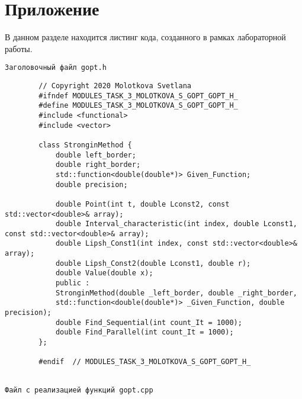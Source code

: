 \documentclass{report}
\begin{document}
	\section*{Приложение}
	В данном разделе находится листинг кода, созданного в рамках лабораторной работы. \par
	\texttt{Заголовочный файл gopt.h}
	\begin{lstlisting}
		// Copyright 2020 Molotkova Svetlana
		#ifndef MODULES_TASK_3_MOLOTKOVA_S_GOPT_GOPT_H_
		#define MODULES_TASK_3_MOLOTKOVA_S_GOPT_GOPT_H_
		#include <functional>
		#include <vector>
		
		class StronginMethod {
			double left_border;
			double right_border;
			std::function<double(double*)> Given_Function;
			double precision;
			
			double Point(int t, double Lconst2, const std::vector<double>& array);
			double Interval_characteristic(int index, double Lconst1, const std::vector<double>& array);
			double Lipsh_Const1(int index, const std::vector<double>& array);
			double Lipsh_Const2(double Lconst1, double r);
			double Value(double x);
			public :
			StronginMethod(double _left_border, double _right_border,
			std::function<double(double*)> _Given_Function, double precision);
			double Find_Sequential(int count_It = 1000);
			double Find_Parallel(int count_It = 1000);
		};
		
		#endif  // MODULES_TASK_3_MOLOTKOVA_S_GOPT_GOPT_H_
		
	\end{lstlisting}
	\texttt{Файл с реализацией функций gopt.cpp}
\end{document}
